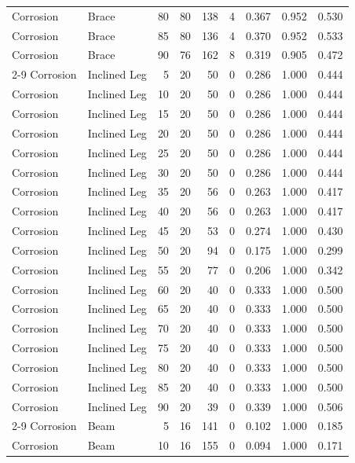 \begin{table}[H]
\begin{tabular}{llrrrrrrr}
    Corrosion & Brace & 80 & 80 & 138 & 4 & 0.367 & 0.952 & 0.530 \\
    Corrosion & Brace & 85 & 80 & 136 & 4 & 0.370 & 0.952 & 0.533 \\
    Corrosion & Brace & 90 & 76 & 162 & 8 & 0.319 & 0.905 & 0.472 \\
    \cmidrule{2-9}
    Corrosion & Inclined Leg & 5 & 20 & 50 & 0 & 0.286 & 1.000 & 0.444 \\
    Corrosion & Inclined Leg & 10 & 20 & 50 & 0 & 0.286 & 1.000 & 0.444 \\
    Corrosion & Inclined Leg & 15 & 20 & 50 & 0 & 0.286 & 1.000 & 0.444 \\
    Corrosion & Inclined Leg & 20 & 20 & 50 & 0 & 0.286 & 1.000 & 0.444 \\
    Corrosion & Inclined Leg & 25 & 20 & 50 & 0 & 0.286 & 1.000 & 0.444 \\
    Corrosion & Inclined Leg & 30 & 20 & 50 & 0 & 0.286 & 1.000 & 0.444 \\
    Corrosion & Inclined Leg & 35 & 20 & 56 & 0 & 0.263 & 1.000 & 0.417 \\
    Corrosion & Inclined Leg & 40 & 20 & 56 & 0 & 0.263 & 1.000 & 0.417 \\
    Corrosion & Inclined Leg & 45 & 20 & 53 & 0 & 0.274 & 1.000 & 0.430 \\
    Corrosion & Inclined Leg & 50 & 20 & 94 & 0 & 0.175 & 1.000 & 0.299 \\
    Corrosion & Inclined Leg & 55 & 20 & 77 & 0 & 0.206 & 1.000 & 0.342 \\
    Corrosion & Inclined Leg & 60 & 20 & 40 & 0 & 0.333 & 1.000 & 0.500 \\
    Corrosion & Inclined Leg & 65 & 20 & 40 & 0 & 0.333 & 1.000 & 0.500 \\
    Corrosion & Inclined Leg & 70 & 20 & 40 & 0 & 0.333 & 1.000 & 0.500 \\
    Corrosion & Inclined Leg & 75 & 20 & 40 & 0 & 0.333 & 1.000 & 0.500 \\
    Corrosion & Inclined Leg & 80 & 20 & 40 & 0 & 0.333 & 1.000 & 0.500 \\
    Corrosion & Inclined Leg & 85 & 20 & 40 & 0 & 0.333 & 1.000 & 0.500 \\
    Corrosion & Inclined Leg & 90 & 20 & 39 & 0 & 0.339 & 1.000 & 0.506 \\
    \cmidrule{2-9}
    Corrosion & Beam & 5 & 16 & 141 & 0 & 0.102 & 1.000 & 0.185 \\
    Corrosion & Beam & 10 & 16 & 155 & 0 & 0.094 & 1.000 & 0.171 \\

\end{tabular}
\end{table}
